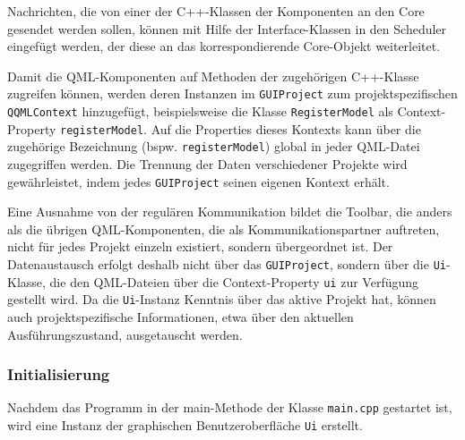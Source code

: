 Nachrichten, die von einer der C++-Klassen der Komponenten an den Core gesendet werden sollen, können mit Hilfe der Interface-Klassen in den Scheduler eingefügt werden, der diese an das korrespondierende Core-Objekt weiterleitet.

Damit die QML-Komponenten auf Methoden der zugehörigen C++-Klasse zugreifen können, werden deren Instanzen im \texttt{GUIProject} zum projektspezifischen \texttt{QQMLContext} hinzugefügt, beispielsweise die Klasse \texttt{RegisterModel} als Context-Property \texttt{registerModel}. Auf die Properties dieses Kontexts kann über die zugehörige Bezeichnung (bspw. \texttt{registerModel}) global in jeder QML-Datei zugegriffen werden. Die Trennung der Daten verschiedener Projekte wird gewährleistet, indem jedes \texttt{GUIProject} seinen eigenen Kontext erhält.

Eine Ausnahme von der regulären Kommunikation bildet die Toolbar, die anders als die übrigen QML-Komponenten, die als Kommunikationspartner auftreten, nicht für jedes Projekt einzeln existiert, sondern übergeordnet ist. Der Datenaustausch erfolgt deshalb nicht über das \texttt{GUIProject}, sondern über die \texttt{Ui}-Klasse, die den QML-Dateien über die Context-Property \texttt{ui} zur Verfügung gestellt wird. Da die \texttt{Ui}-Instanz Kenntnis über das aktive Projekt hat, können auch projektspezifische Informationen, etwa über den aktuellen Ausführungszustand, ausgetauscht werden.


\subsubsection{Initialisierung}

Nachdem das Programm in der main-Methode der Klasse \texttt{main.cpp} gestartet ist, wird eine Instanz der graphischen Benutzeroberfläche \texttt{Ui} erstellt.
